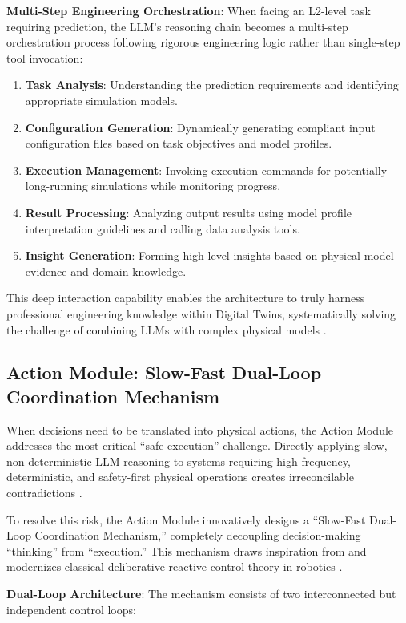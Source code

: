 \textbf{Multi-Step Engineering Orchestration}: When facing an L2-level task requiring prediction, the LLM's reasoning chain becomes a multi-step orchestration process following rigorous engineering logic rather than single-step tool invocation:

\begin{enumerate}
\item \textbf{Task Analysis}: Understanding the prediction requirements and identifying appropriate simulation models.
\item \textbf{Configuration Generation}: Dynamically generating compliant input configuration files based on task objectives and model profiles.
\item \textbf{Execution Management}: Invoking execution commands for potentially long-running simulations while monitoring progress.
\item \textbf{Result Processing}: Analyzing output results using model profile interpretation guidelines and calling data analysis tools.
\item \textbf{Insight Generation}: Forming high-level insights based on physical model evidence and domain knowledge.
\end{enumerate}

This deep interaction capability enables the architecture to truly harness professional engineering knowledge within Digital Twins, systematically solving the challenge of combining LLMs with complex physical models \cite{lu2022unified}.

\subsection{Action Module: Slow-Fast Dual-Loop Coordination Mechanism}

When decisions need to be translated into physical actions, the Action Module addresses the most critical ``safe execution'' challenge. Directly applying slow, non-deterministic LLM reasoning to systems requiring high-frequency, deterministic, and safety-first physical operations creates irreconcilable contradictions \cite{amodei2016concrete}.

To resolve this risk, the Action Module innovatively designs a ``Slow-Fast Dual-Loop Coordination Mechanism,'' completely decoupling decision-making ``thinking'' from ``execution.'' This mechanism draws inspiration from and modernizes classical deliberative-reactive control theory in robotics \cite{gat1998three}.

\textbf{Dual-Loop Architecture}: The mechanism consists of two interconnected but independent control loops:

